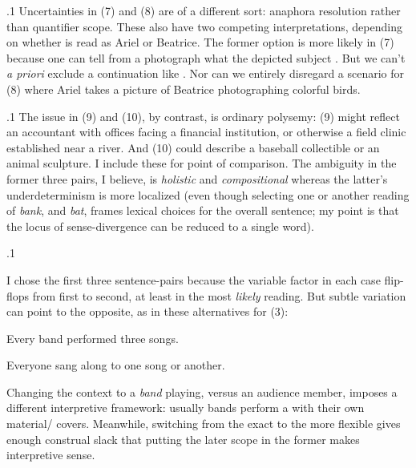 \documentclass[11pt, twocolumn]{article}
\begin{document}
\p.1{%
Uncertainties in \exsRef(7) and \exsRef(8) are of a different sort: anaphora resolution rather than quantifier scope.
These also have two competing interpretations, depending on whether  is read as Ariel or Beatrice. The
former option is more likely in \exsRef(7) because one can tell from a photograph what the depicted subject
. But we can't \textit{a priori} exclude a continuation like .
Nor can we entirely disregard a scenario for \exsRef(8) where Ariel takes a picture of
Beatrice photographing colorful birds.
}%

\p.1{%
The issue in \exsRef(9) and \exsRef(10), by contrast, is ordinary polysemy: \exsRef(9) might reflect an
accountant with offices facing a financial institution, or otherwise a field clinic established \pgl{}near
a river. And \exsRef(10) could describe a baseball collectible or an animal sculpture.
I include these for point of comparison. The ambiguity in the former three pairs,
I believe, is \textit{holistic} and \textit{compositional} whereas the latter's underdeterminism
is more localized (even though selecting one or another reading of \textit{bank}, and
\textit{bat}, frames lexical choices for the overall sentence; my point is that
the locus of sense-divergence can be reduced to a single word).
}%

\p.1{%
I chose the first three sentence-pairs because the variable factor in each
case flip-flops from first to second, at least
in the most \textit{likely} reading. But subtle variation can point to the opposite, as in these alternatives
for \exsRef(3):

\begin{exsGroup}

\exsItem{}  Every band performed three songs.

\exsItem{}  Everyone sang along to one song or another.

\end{exsGroup}

\nip{}%
Changing the context to a \textit{band} playing, versus an audience member, imposes a different interpretive
framework: usually bands perform a  with their own material/ covers. Meanwhile, switching
from the exact  to the more flexible  gives enough construal slack that
putting the later scope in the former makes interpretive sense.
\ifnum{}\else{\thispagestyle{two}}\fi
}%
\end{document}
